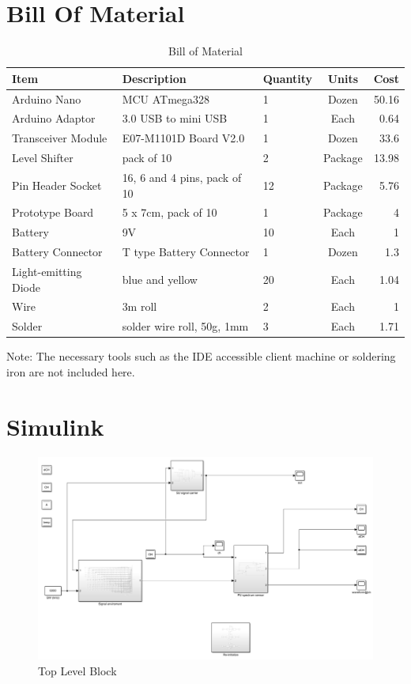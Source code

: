 \chapter{Bill Of Material}
\begin{table}[h]
\centering
    \begin{tabular}{| l | l | l | c | r | }
    \hline
    Item & Description & Quantity & Units & Cost \\ 
    \hline
    \rowcolor{lightgray} Arduino Nano & MCU ATmega328 & 1 &  Dozen &  50.16 \\ 
    Arduino Adaptor  &  3.0 USB to mini USB & 1 &  Each &  0.64 \\ 
    \rowcolor{lightgray} Transceiver Module & E07-M1101D Board V2.0 & 1 &  Dozen &  33.6 \\ 
    Level Shifter &  pack of 10 & 2 &  Package & 13.98 \\ 
    \rowcolor{lightgray} Pin Header Socket &  16, 6 and 4 pins, pack of 10 & 12 &  Package &  5.76 \\ 
    Prototype Board & 5 x 7cm, pack of 10 & 1 &  Package &  4 \\ 
    \rowcolor{lightgray} Battery & 9V & 10 & Each &  1 \\ 
    Battery Connector &  T type Battery Connector & 1 & Dozen & 1.3 \\ 
    \rowcolor{lightgray} Light-emitting Diode &  blue and yellow & 20 &  Each &  1.04 \\ 
    Wire &  3m roll & 2 & Each &  1 \\ 
    \rowcolor{lightgray} Solder &  solder wire roll, 50g, 1mm & 3 &  Each &  1.71 \\ 
    \hline
    \hline
    \end{tabular}
    \begin{tablenotes}
    \small
    \item Note: The necessary tools such as the IDE accessible client machine or soldering iron are not included here.
\end{tablenotes}
\caption{Bill of Material}
\label{tab:bill}
\end{table}

\chapter{Simulink}
\begin{figure}[ht]
\centering
\includegraphics[width=12cm]{figures/top_level_simulink.png}
\caption{Top Level Block}
\label{fig:top_level_simulink}
\end{figure}

